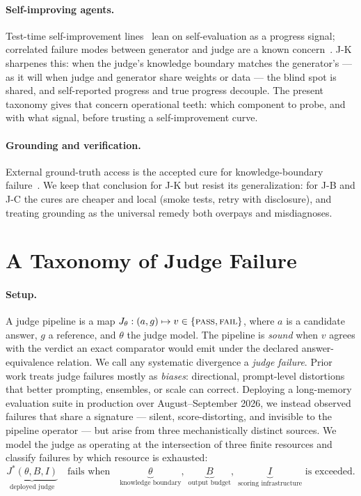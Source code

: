 \documentclass[11pt]{article}
\begin{document}
\paragraph{Self-improving agents.}
Test-time self-improvement lines~\cite{voyager,reflexion} lean on
self-evaluation as a progress signal; correlated failure modes between
generator and judge are a known concern~\cite{trt2026,crescent2025}. J-K
sharpenes this: when the judge's knowledge boundary matches the generator's
--- as it will when judge and generator share weights or data --- the blind
spot is shared, and self-reported progress and true progress decouple. The
present taxonomy gives that concern operational teeth: which component to
probe, and with what signal, before trusting a self-improvement curve.

\paragraph{Grounding and verification.}
External ground-truth access is the accepted cure for knowledge-boundary
failure~\cite{gu2024survey}. We keep that conclusion for J-K but resist its
generalization: for J-B and J-C the cures are cheaper and local (smoke
tests, retry with disclosure), and treating grounding as the universal
remedy both overpays and misdiagnoses.


\section{A Taxonomy of Judge Failure}
\label{sec:taxonomy}

\paragraph{Setup.}
A judge pipeline is a map $J_\theta : (a, g) \mapsto v \in \{\textsc{pass}, \textsc{fail}\}$,
where $a$ is a candidate answer, $g$ a reference, and $\theta$ the judge model.
The pipeline is \emph{sound} when $v$ agrees with the verdict an exact comparator
would emit under the declared answer-equivalence relation. We call any systematic
divergence a \emph{judge failure}. Prior work treats judge failures mostly as
\emph{biases}: directional, prompt-level distortions that better prompting, ensembles,
or scale can correct. Deploying a long-memory evaluation suite in production over
August--September 2026, we instead observed failures that share a signature ---
silent, score-distorting, and invisible to the pipeline operator --- but arise from
three mechanistically distinct sources. We model the judge as operating at the
intersection of three finite resources and classify failures by which resource is
exhausted:
\[
\underbrace{J^{*}(\theta, B, I)}_{\text{deployed judge}}
\quad\text{fails when}\quad
\underbrace{\theta}_{\text{knowledge boundary}},\;
\underbrace{B}_{\text{output budget}},\;
\underbrace{I}_{\text{scoring infrastructure}}
\text{ is exceeded.}
\]
\end{document}
